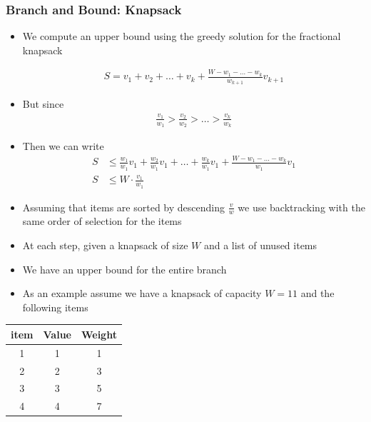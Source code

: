\documentclass{beamer}
\begin{document}
\begin{frame}
  \frametitle{Branch and Bound: Knapsack}
  \begin{itemize}
  \item We compute an upper bound using the greedy solution for the fractional knapsack

  \begin{align*}
    S=v_1+v_2+\ldots +v_k+\frac{W-w_1-\ldots -w_k}{w_{k+1}}v_{k+1}
  \end{align*}
\item But since
  \begin{align*}
    \frac{v_1}{w_1}> \frac{v_2}{w_2}>\ldots >\frac{v_k}{w_k}
  \end{align*}

\item Then we can write
  \begin{align*}
    S&\le \frac{w_1}{w_1}v_1+\frac{w_2}{w_1}v_1+\ldots +\frac{w_k}{w_1}v_1+\frac{W-w_1-\ldots -w_k}{w_{1}}v_{1}\\
    S&\le W\cdot \frac{v_1}{w_1}
  \end{align*}

  \end{itemize}
\end{frame}
\begin{frame}
  \begin{itemize}
  \item Assuming that items are sorted by descending $\frac{v}{w}$ we use backtracking with the same order of selection for the items
  \item At each step, given a knapsack of size $W$ and a list of unused items 
  \item We have an upper bound for the entire branch
  \item As an example assume we have a knapsack of capacity $W=11$ and the following items
  \end{itemize}
  \begin{tabular}[h]{c|c|c|}
   item & Value & Weight\\
\hline
   1 & 1 &1\\
   2 & 2 & 3\\
   3 & 3 & 5\\
   4 & 4 & 7
  \end{tabular}
\end{frame}
\end{document}
